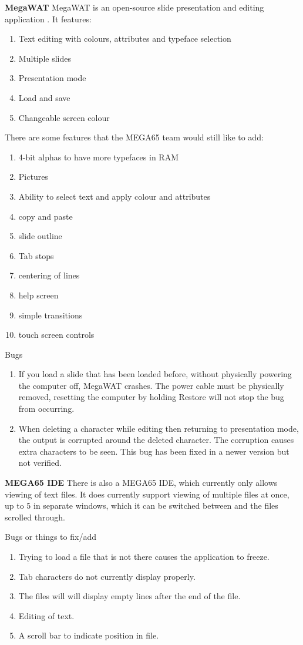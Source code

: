 \textbf{MegaWAT} 
MegaWAT is an open-source slide presentation and editing application \cite{RN163}. It features:
\begin{enumerate}
\item Text editing with colours, attributes and typeface selection
\item Multiple slides
\item Presentation mode
\item Load and save
\item Changeable screen colour
\end{enumerate}
There are some features that the MEGA65 team would still like to add:
\begin{enumerate}
\item 4-bit alphas to have more typefaces in RAM
\item Pictures
\item Ability to select text and apply colour and attributes
\item copy and paste
\item slide outline
\item Tab stops
\item centering of lines
\item help screen
\item simple transitions
\item touch screen controls
\end{enumerate}

Bugs
\begin{enumerate}
\item If you load a slide that has been loaded before, without physically powering the computer off, MegaWAT crashes. The power cable must be physically removed, resetting the computer by holding Restore will not stop the bug from occurring.
\item When deleting a character while editing then returning to presentation mode, the output is corrupted around the deleted character. The corruption causes extra characters to be seen. This bug has been fixed in a newer version but not verified. 
\end{enumerate}

\textbf{MEGA65 IDE}
There is also a MEGA65 IDE, which currently only allows viewing of text files. It does currently support viewing of multiple files at once, up to 5 in separate windows, which it can be switched between and the files scrolled through.

Bugs or things to fix/add
\begin{enumerate}
\item Trying to load a file that is not there causes the application to freeze.
\item Tab characters do not currently display properly.
\item The files will will display empty lines after the end of the file.
\item Editing of text.
\item A scroll bar to indicate position in file.
\end{enumerate}

